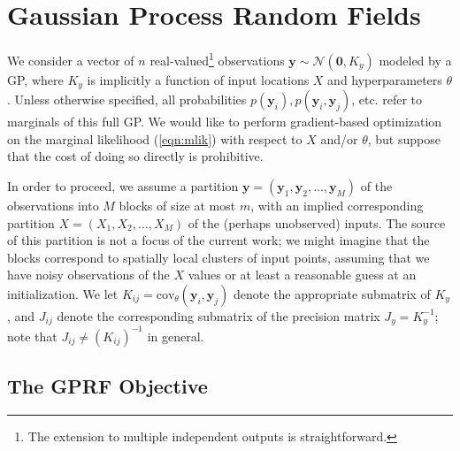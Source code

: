 \documentclass{article}
\newcommand{\N}{\mathcal{N}}
\newcommand{\cov}{\text{cov}}
\renewcommand{\v}[1]{\mathbf{#1}}
\begin{document}
\section{Gaussian Process Random Fields}
\label{sec:gprf}

We consider a vector of $n$ real-valued\footnote{The extension to
  multiple independent outputs is straightforward.} observations
$\v{y} \sim \N(\v{0}, K_y)$ modeled by a GP, where $K_y$ is implicitly
a function of input locations $X$ and hyperparameters $\theta$. Unless
otherwise specified, all probabilities $p(\v{y}_i), p(\v{y}_i,
\v{y}_j)$, etc. refer to marginals of this full GP. We would like to
perform gradient-based optimization on the marginal likelihood
(\ref{eqn:mlik}) with respect to $X$ and/or $\theta$, but suppose that
the cost of doing so directly is prohibitive.

In order to proceed, we assume a partition $\v{y} = (\v{y}_1, \v{y}_2,
\ldots, \v{y}_M)$ of the observations into $M$ blocks of size at most
$m$, with an implied corresponding partition $X = (X_1, X_2, \ldots,
X_M)$ of the (perhaps unobserved) inputs. The source of this partition
is not a focus of the current work; we might imagine that the blocks
correspond to spatially local clusters of input points, assuming that
we have noisy observations of the $X$ values or at least a reasonable
guess at an initialization. We let $K_{ij} = \cov_\theta(\v{y}_i,
\v{y}_j)$ denote the appropriate submatrix of $K_{y}$, and $J_{ij}$
denote the corresponding submatrix of the precision matrix
$J_y=K_y^{-1}$; note that $J_{ij} \ne (K_{ij})^{-1}$ in general.

\subsection{The GPRF Objective}
\end{document}
